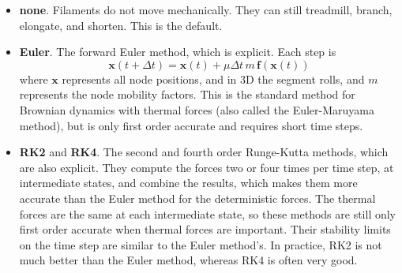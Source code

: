 \documentclass {scrbook}
\begin{document}
\begin{itemize}
\item \textbf{none}. Filaments do not move mechanically. They can still treadmill, branch, elongate, and shorten. This is the default.

\item \textbf{Euler}. The forward Euler method, which is explicit. Each step is
$$\bm{x}(t+\Delta t) = \bm{x}(t) + \mu \Delta t\, m\, \bm{f}(\bm{x}(t))$$
where $\bm{x}$ represents all node positions, and in 3D the segment rolls, and $m$ represents the node mobility factors. This is the standard method for Brownian dynamics with thermal forces (also called the Euler-Maruyama method), but is only first order accurate and requires short time steps.

\item \textbf{RK2} and \textbf{RK4}. The second and fourth order Runge-Kutta methods, which are also explicit. They compute the forces two or four times per time step, at intermediate states, and combine the results, which makes them more accurate than the Euler method for the deterministic forces. The thermal forces are the same at each intermediate state, so these methods are still only first order accurate when thermal forces are important. Their stability limits on the time step are similar to the Euler method's. In practice, RK2 is not much better than the Euler method, whereas RK4 is often very good.


\end{itemize}
\end{document}
